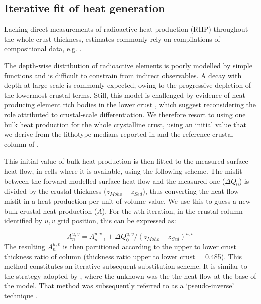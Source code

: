 \subsection{Iterative fit of heat generation}
\label{ss:Appl:ThermRHP}
Lacking direct measurements of radioactive heat production (RHP) throughout the whole crust thickness, estimates commonly rely on compilations of compositional data, e.g. \textcites{Vila2010}{Artemieva2017granite}{Hasterok2017_ign}{Hasterok2017_mis}.

The depth-wise distribution of radioactive elements is poorly modelled by simple functions \parencite{Jaupart2003} and is difficult to constrain from indirect observables.
A decay with depth at large scale is commonly expected, owing to the progressive depletion of the lowermost crustal terms.
Still, this model is challenged by evidence of heat-producing element rich bodies in the lower crust \parencite{Alessio2018deepRHP}, which suggest reconsidering the role attributed to crustal-scale differentiation.
We therefore resort to using one bulk heat production for the whole crystalline crust, using an initial value that we derive from the lithotype medians reported in \textcite{Vila2010} and the reference crustal column of \textcite{Wedepohl1995}.

This initial value of bulk heat production is then fitted to the measured surface heat flow, in cells where it is available, using the following scheme.
The misfit between the forward-modelled surface heat flow and the measured one ($\Delta Q_0$) is divided by the crustal thickness ($z_{Moho} - z_{Sed}$), thus converting the heat flow misfit in a heat production per unit of volume value.
We use this to guess a new bulk crustal heat production ($A$).
For the $n$th iteration, in the crustal column identified by $u, v$ grid position, this can be expressed as:

\begin{equation}
	\label{eq:IterativeRHP}
	A_n^{u,v} = A_{n-1}^{u,v} + \Delta Q_0^{u,v} / (z_{Moho} - z_{Sed})^{u,v}
\end{equation}
The resulting $A_n^{u,v}$ is then partitioned according to the upper to lower crust thickness ratio of \textcite{Wedepohl1995} column (thickness ratio upper to lower crust = 0.485).
This method constitutes an iterative subsequent substitution scheme.
It is similar to the strategy adopted by \textcite{Cermak1986}, where the unknown was the the heat flow at the base of the model.
That method was subsequently referred to as a `pseudo-inverse' technique \parencite{Cermak1993}.

